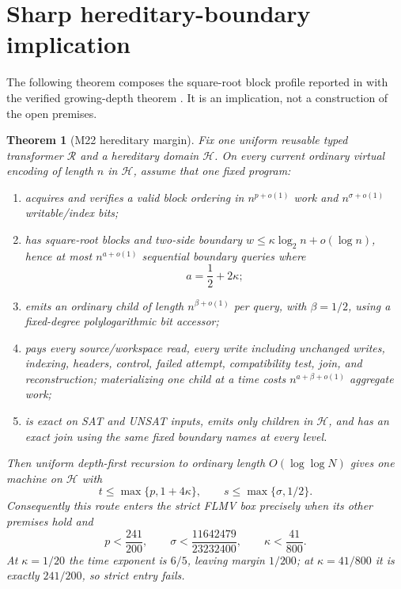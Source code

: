 \documentclass[11pt]{article}
\newtheorem{theorem}{Theorem}
\begin{document}
\section{Sharp hereditary-boundary implication}
The following theorem composes the square-root block profile reported in
 with the verified growing-depth theorem
.  It is an implication, not a construction
of the open premises.

\begin{theorem}[M22 hereditary margin]\label{thm:margin}
Fix one uniform reusable typed transformer $\mathcal R$ and a hereditary
domain $\mathcal H$.  On every current ordinary virtual encoding of length
$n$ in $\mathcal H$, assume that one fixed program:
\begin{enumerate}
\item acquires and verifies a valid block ordering in
$n^{p+o(1)}$ work and $n^{\sigma+o(1)}$ writable/index bits;
\item has square-root blocks and two-side boundary
$w\le \kappa\log_2n+o(\log n)$, hence at most
$n^{a+o(1)}$ sequential boundary queries where
\[
 a=\frac12+2\kappa;
\]
\item emits an ordinary child of length $n^{\beta+o(1)}$ per query, with
$\beta=1/2$, using a fixed-degree polylogarithmic bit accessor;
\item pays every source/workspace read, every write including unchanged
writes, indexing, headers, control, failed attempt, compatibility test,
join, and reconstruction; materializing one child at a time costs
$n^{a+\beta+o(1)}$ aggregate work;
\item is exact on SAT and UNSAT inputs, emits only children in $\mathcal H$,
and has an exact join using the same fixed boundary names at every level.
\end{enumerate}
Then uniform depth-first recursion to ordinary length $O(\log\log N)$ gives
one machine on $\mathcal H$ with
\[
 t\le \max\{p,1+4\kappa\},\qquad
 s\le \max\{\sigma,1/2\}.
\]
Consequently this route enters the strict FLMV box precisely when its other
premises hold and
\[
 p<\frac{241}{200},\qquad
 \sigma<\frac{11642479}{23232400},\qquad
 \kappa<\frac{41}{800}.
\]
At $\kappa=1/20$ the time exponent is $6/5$, leaving margin $1/200$;
at $\kappa=41/800$ it is exactly $241/200$, so strict entry fails.
\end{theorem}
\end{document}
